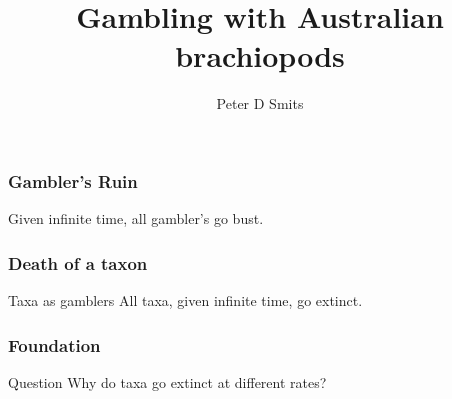 \documentclass{beamer}
\title{Gambling with Australian brachiopods}
\author{Peter D Smits}
\institute{Committee on Evolutionary Biology, University of Chicago}
\date{}
\begin{document}
\begin{frame}
  \maketitle
\end{frame}


\begin{frame}
  \frametitle{Gambler's Ruin}

  \begin{definition}
    Given infinite time, all gambler's go bust. 
  \end{definition}
\end{frame}


\begin{frame}
  \frametitle{Death of a taxon}

  \begin{block}{Taxa as gamblers}
    All taxa, given infinite time, go extinct.
  \end{block}
\end{frame}


\begin{frame}
  \frametitle{Foundation}

  \begin{alertblock}{Question}
    Why do taxa go extinct at \alert{different rates}?
  \end{alertblock}
\end{frame}
\end{document}

